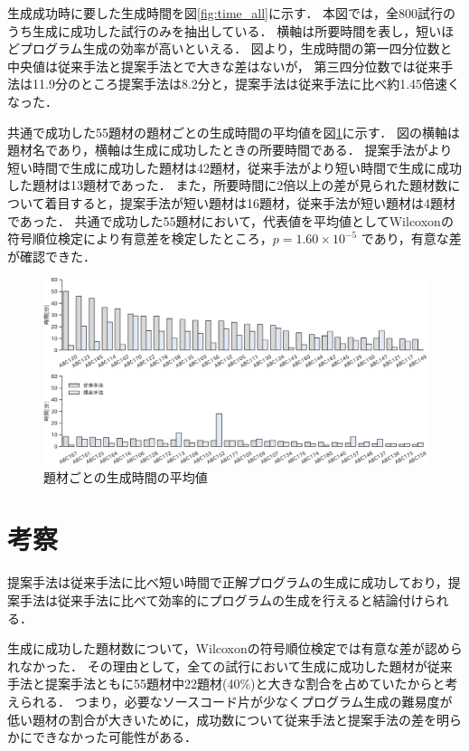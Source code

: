 \documentclass[uplatex,dvipdfmx,a4paper]{jsarticle}
\begin{document}
生成成功時に要した生成時間を図\ref{fig:time_all}に示す．
本図では，全800試行のうち生成に成功した試行のみを抽出している．
横軸は所要時間を表し，短いほどプログラム生成の効率が高いといえる．
図より，生成時間の第一四分位数と中央値は従来手法と提案手法とで大きな差はないが，
第三四分位数では従来手法は11.9分のところ提案手法は8.2分と，提案手法は従来手法に比べ約1.45倍速くなった．

共通で成功した55題材の題材ごとの生成時間の平均値を図\ref{fig:time_indiv}に示す．
図の横軸は題材名であり，横軸は生成に成功したときの所要時間である．
提案手法がより短い時間で生成に成功した題材は42題材，従来手法がより短い時間で生成に成功した題材は13題材であった．
また，所要時間に2倍以上の差が見られた題材数について着目すると，提案手法が短い題材は16題材，従来手法が短い題材は4題材であった．
共通で成功した55題材において，代表値を平均値としてWilcoxonの符号順位検定により有意差を検定したところ，$p=1.60 \times 10^{-5}$ であり，有意な差が確認できた．

\begin{landscape}
  \begin{figure}[p]
    \centering
    \includegraphics[width=\linewidth]{fig/individualBar.pdf}
    \caption{題材ごとの生成時間の平均値}
    \label{fig:time_indiv}
  \end{figure}
\end{landscape}

\clearpage
\section{考察}
提案手法は従来手法に比べ短い時間で正解プログラムの生成に成功しており，提案手法は従来手法に比べて効率的にプログラムの生成を行えると結論付けられる．

生成に成功した題材数について，Wilcoxonの符号順位検定では有意な差が認められなかった．
その理由として，全ての試行において生成に成功した題材が従来手法と提案手法ともに55題材中22題材(40\%)と大きな割合を占めていたからと考えられる．
つまり，必要なソースコード片が少なくプログラム生成の難易度が低い題材の割合が大きいために，成功数について従来手法と提案手法の差を明らかにできなかった可能性がある．
\end{document}

